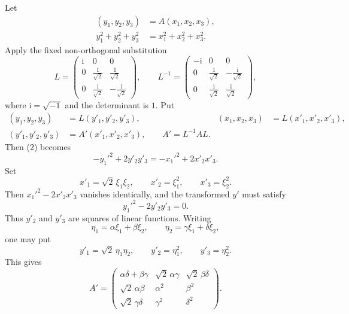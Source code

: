\documentclass[11pt]{article}
\providecommand{\ii}{\mathrm{i}}
\begin{document}
Let
\begin{align}
(y_1,y_2,y_3)&=A(x_1,x_2,x_3),\tag{1}\\
y_1^2+y_2^2+y_3^2&=x_1^2+x_2^2+x_3^2.\tag{2}
\end{align}
Apply the fixed non-orthogonal substitution
\begin{equation}
L=\begin{pmatrix}
\ii&0&0\\
0&\frac1{\sqrt2}&\frac1{\sqrt2}\\
0&\frac{\ii}{\sqrt2}&-\frac{\ii}{\sqrt2}
\end{pmatrix},\qquad
L^{-1}=\begin{pmatrix}
-\ii&0&0\\
0&\frac1{\sqrt2}&-\frac{\ii}{\sqrt2}\\
0&\frac1{\sqrt2}&\frac{\ii}{\sqrt2}
\end{pmatrix},
\tag{3}
\end{equation}
where $\ii=\sqrt{-1}$ and the determinant is $1$. Put
\begin{align}
(y_1,y_2,y_3)&=L(y'_1,y'_2,y'_3),&(x_1,x_2,x_3)&=L(x'_1,x'_2,x'_3),\tag{4}\\
(y'_1,y'_2,y'_3)&=A'(x'_1,x'_2,x'_3),\qquad A'=L^{-1}AL.\tag{5--6}
\end{align}
Then (2) becomes
\begin{equation}
-y_1'^2+2y'_2y'_3=-x_1'^2+2x'_2x'_3.
\tag{7}
\end{equation}
Set
\begin{equation}
x'_1=\sqrt2\,\xi_1\xi_2,
\qquad x'_2=\xi_1^2,
\qquad x'_3=\xi_2^2.
\tag{8}
\end{equation}
Then $x_1'^2-2x'_2x'_3$ vanishes identically, and the transformed $y'$ must satisfy
\begin{equation}
y_1'^2-2y'_2y'_3=0.
\tag{9}
\end{equation}
Thus $y'_2$ and $y'_3$ are squares of linear functions. Writing
\begin{equation}
\eta_1=\alpha\xi_1+\beta\xi_2,
\qquad
\eta_2=\gamma\xi_1+\delta\xi_2,
\tag{10}
\end{equation}
one may put
\begin{equation}
y'_1=\sqrt2\,\eta_1\eta_2,
\qquad y'_2=\eta_1^2,
\qquad y'_3=\eta_2^2.
\tag{11}
\end{equation}
This gives
\begin{equation}
A'=\begin{pmatrix}
\alpha\delta+\beta\gamma&\sqrt2\,\alpha\gamma&\sqrt2\,\beta\delta\\
\sqrt2\,\alpha\beta&\alpha^2&\beta^2\\
\sqrt2\,\gamma\delta&\gamma^2&\delta^2
\end{pmatrix}.
\tag{12}
\end{equation}
\end{document}

